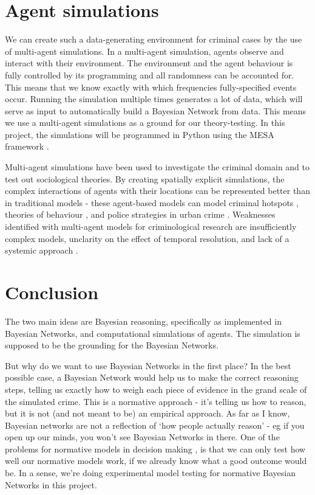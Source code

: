 \section{Agent simulations}
We can create such a data-generating environment for criminal cases by the use of multi-agent simulations. In a multi-agent simulation, agents observe and interact with their environment. The environment and the agent behaviour is fully controlled by its programming and all randomness can be accounted for. This means that we know exactly with which frequencies fully-specified events occur. Running the simulation multiple times generates a lot of data, which will serve as input to automatically build a Bayesian Network from data. This means we use a multi-agent simulations as a ground for our theory-testing. In this project, the simulations will be programmed in Python using the MESA framework  \citep{mesa2020}.


Multi-agent simulations have been used to investigate the criminal domain and to test out sociological theories. By creating spatially explicit simulations, the complex interactions of agents with their locations can be represented better than in traditional models - these agent-based models can model criminal hotspots \citep{Gerritsen2008}, theories of behaviour \citep{Gerritsen2015}, and police strategies in urban crime \citep{Zhu2021}. Weaknesses identified with multi-agent models for criminological research are insufficiently complex models, unclarity on the effect of temporal resolution, and lack of a systemic approach \citep{Zhu2021}.



 \section{Conclusion}

The two main ideas are Bayesian reasoning, specifically as implemented in Bayesian Networks, and computational simulations of agents. The simulation is supposed to be the grounding for the Bayesian Networks.

But why do we want to use Bayesian Networks in the first place? In the best possible case, a Bayesian Network would help us to make the correct reasoning steps, telling us exactly how to weigh each piece of evidence in the grand scale of the simulated crime. This is a normative approach - it's telling us how to reason, but it is not (and not meant to be) an empirical approach. As far as I know, Bayesian networks are not a reflection of `how people actually reason' - eg if you open up our minds, you won't see Bayesian Networks in there. One of the problems for normative models in decision making \citep{colyvan2013}, is that we can only test how well our normative models work, if we already know what a good outcome would be. In a sense, we're doing experimental model testing for normative Bayesian Networks in this project.



